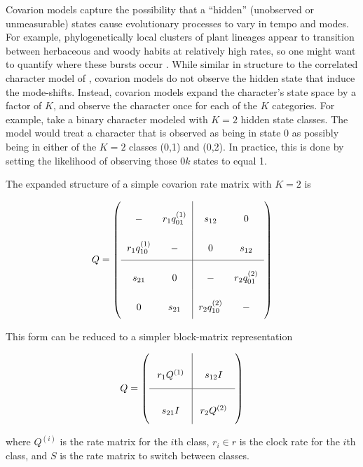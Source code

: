 Covarion models \citep{tuffley98} capture the possibility that a ``hidden'' (unobserved or unmeasurable) states cause evolutionary processes to vary in tempo and modes.
For example, phylogenetically local clusters of plant lineages appear to transition between herbaceous and woody habits at relatively high rates, so one might want to quantify where these bursts occur \citep{beaulieu2013}.
While similar in structure to the correlated character model of \citet{pagel94}, covarion models do not observe the hidden state that induce the mode-shifts.
Instead, covarion models expand the character's state space by a factor of $K$, and observe the character once for each of the $K$ categories.
For example, take a binary character modeled with $K=2$ hidden state classes.
The model would treat a character that is observed as being in state 0 as possibly being in either of the $K=2$ classes (0,1) and (0,2).
In practice, this is done by setting the likelihood of observing those $0k$ states to equal 1.

The expanded structure of a simple covarion rate matrix with $K=2$ is

\begin{equation*}
Q = \left(
\arraycolsep=6pt\def\arraystretch{2.5}
\begin{array}{cc|cc}
- & r_1 q_{01}^{(1)} & s_{12} & 0 \\
r_1 q_{10}^{(1)} & - & 0 & s_{12} \\
\hline
s_{21} & 0 & - & r_2 q_{01}^{(2)} \\
0 & s_{21} & r_2 q_{10}^{(2)} & -  \\

\end{array}
\right)    
\end{equation*}

This form can be reduced to a simpler block-matrix representation

\begin{equation*}
Q = \left(
\arraycolsep=8pt\def\arraystretch{3.0}
\begin{array}{c|c}
r_1 Q^{(1)} & s_{12} I  \\
\hline
s_{21} I & r_2 Q^{(2)} \\
\end{array}
\right)
\end{equation*}


where $Q^{(i)}$ is the rate matrix for the $i$th class, $r_i \in r$ is the clock rate for the $i$th class, and $S$ is the rate matrix to switch between classes.


